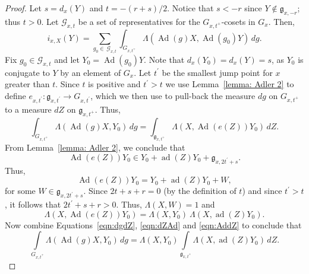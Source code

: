 \documentclass[11pt]{amsart}
\theoremstyle{definition}
\theoremstyle{remark}
\numberwithin{equation}{theorem}
\def\GF{{G}}
\def\gF{{\mathfrak{g}}}
\def\kill#1#2{{\Lambda\left({#1},{#2}\right)}}
\def\i{{i}}
\def\Ad{{\rm Ad}}
\def\ad{{\rm ad}}
\def\Ad{\operatorname{Ad}}
\def\ad{\operatorname{ad}}
\begin{document}
\begin{proof}
Let $s = d_x(Y)$ and $t = -(r + s)/2$. Notice that $s < -r$ since
$Y \not\in \gF_{x,-r}$; thus $t > 0$. Let $\mathcal{G}_{x,t}$ be a
set of representatives for the $\GF_{x,t^+}$-cosets in $\GF_{x}$.
Then,
\begin{equation}\label{eqn:isum}
\i_{x,X}(Y) = \sum_{g_0 \in\, \mathcal{G}_{x,t} } \int_{\GF_{x,t^+}}
\kill{\Ad(g)X}{\Ad(g_0)Y}\, dg.
\end{equation}
Fix $g_0 \in \mathcal{G}_{x,t}$ and let $Y_0 = \Ad(g_0)Y$. Note
that $d_x(Y_0) = d_x(Y) =s$, as $Y_0$ is conjugate to $Y$ by an
element of $\GF_x$. Let $t^\prime$ be the smallest jump point for
$x$ greater than $t$. Since $t$ is positive and $t^\prime > t$ we
use Lemma~\ref{lemma: Adler 2} to define $e_{x,t^\prime} :
\gF_{x,t^\prime} \to \GF_{x,t^\prime}$, which we then use to
pull-back the measure $dg$ on $\GF_{x,t^+}$ to a measure $dZ$ on
$\gF_{x,t^+}$. Thus,
\begin{equation}\label{eqn:dgdZ}
\int_{\GF_{x,t^+}} \kill{\Ad(g)X}{Y_0}\, dg = \int_{\gF_{x,t^+}}
\kill{X}{\Ad(e(Z))Y_0}\, dZ.
\end{equation}
From Lemma~\ref{lemma: Adler 2}, we conclude that
\begin{equation}
\Ad(e(Z)) Y_0 \in Y_0 + \ad(Z) Y_0 + \gF_{x,2t^\prime + s}.
\end{equation}
Thus,
\begin{equation}\label{eqn:dZAd}
\Ad(e(Z)) Y_0 = Y_0 + \ad(Z) Y_0 + W,
\end{equation}
for some $W \in \gF_{x,2t^\prime + s}$. Since $2t+s + r =0$ (by the
definition of
$t$) and since $t^\prime > t$, it follows that  $2t^\prime + s + r > 0$.
Thus,
$\kill{X}{W}=1$ and
\begin{equation}\label{eqn:AddZ}
\kill{X}{\Ad(e(Z))Y_0} = \kill{X}{Y_0}\  \kill{X}{\ad(Z)Y_0}.
\end{equation}
Now combine Equations~\ref{eqn:dgdZ}, \ref{eqn:dZAd} and
\ref{eqn:AddZ} to conclude that
\begin{equation}
\int\limits_{\GF_{x,t^+}} \kill{\Ad(g)X}{Y_0}\, dg = \kill{X}{Y_0}
\int\limits_{\gF_{x,t^+}} \kill{X}{\ad(Z)Y_0}\, dZ.
\end{equation}


\end{proof}
\end{document}
